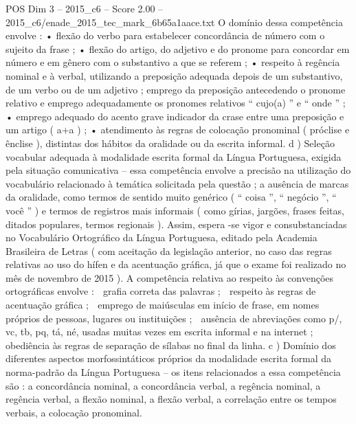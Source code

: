 \begin{textsample}{POS Dim 3 – 2015\_c6 – Score 2.00 – 2015\_c6/enade\_2015\_tec\_mark\_6b65a1aace.txt}
O domínio dessa competência envolve : • flexão do verbo para estabelecer concordância de número com o sujeito da frase ; • flexão do artigo, do adjetivo e do pronome para concordar em número e em gênero com o substantivo a que se referem ; • respeito à regência nominal e à verbal, utilizando a preposição adequada depois de um substantivo, de um verbo ou de um adjetivo ; emprego da preposição antecedendo o pronome relativo e emprego adequadamente os pronomes relativos “ cujo(a) ” e “ onde ” ; • emprego adequado do acento grave indicador da crase entre uma preposição e um artigo ( a+a ) ; • atendimento às regras de colocação pronominal ( próclise e ênclise ), distintas dos hábitos da oralidade ou da escrita informal. d ) Seleção vocabular adequada à modalidade escrita formal da Língua Portuguesa, exigida pela situação comunicativa – essa competência envolve a precisão na utilização do vocabulário relacionado à temática solicitada pela questão ; a ausência de marcas da oralidade, como termos de sentido muito genérico ( “ coisa ”, “ negócio ”, “ você ” ) e termos de registros mais informais ( como gírias, jargões, frases feitas, ditados populares, termos regionais ).
Assim, espera -se vigor e consubstanciadas no Vocabulário Ortográfico da Língua Portuguesa, editado pela Academia Brasileira de Letras ( com aceitação da legislação anterior, no caso das regras relativas ao uso do hífen e da acentuação gráfica, já que o exame foi realizado no mês de novembro de 2015 ).
A competência relativa ao respeito às convenções ortográficas envolve :  grafia correta das palavras ;  respeito às regras de acentuação gráfica ;  emprego de maiúsculas em início de frase, em nomes próprios de pessoas, lugares ou instituições ;  ausência de abreviações como p/, vc, tb, pq, tá, né, usadas muitas vezes em escrita informal e na internet ;  obediência às regras de separação de sílabas no final da linha. c ) Domínio dos diferentes aspectos morfossintáticos próprios da modalidade escrita formal da norma-padrão da Língua Portuguesa – os itens relacionados a essa competência são : a concordância nominal, a concordância verbal, a regência nominal, a regência verbal, a flexão nominal, a flexão verbal, a correlação entre os tempos verbais, a colocação pronominal.

\end{textsample}
